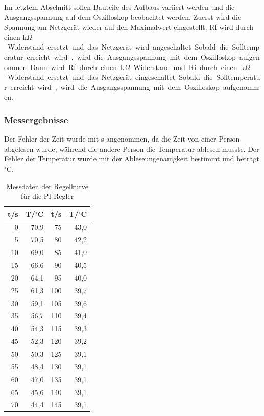 \documentclass[12pt,a4paper]{article}
\begin{document}
Im letztem Abschnitt sollen Bauteile des Aufbaus variiert werden und die Ausgangsspannung auf dem Oszilloskop beobachtet werden. Zuerst wird die Spannung am Netzgerät wieder auf den Maximalwert eingestellt. Rf wird durch einen \unit[470]{k$\Omega$} Widerstand ersetzt und das Netzgerät wird angeschaltet. Sobald die Solltemperatur erreicht wird, wird die Ausgangsspannung mit dem Oszilloskop aufgenommen. Dann wird Rf durch einen \unit[470]{k$\Omega$} Widerstand und Ri durch einen \unit[10]{k$\Omega$} Widerstand ersetzt und das Netzgerät eingeschaltet. Sobald die Solltemperatur erreicht wird, wird die Ausgangsspannung mit dem Oszilloskop aufgenommen.

\subsubsection*{Messergebnisse}

Der Fehler der Zeit wurde mit \unit[0,5]{s} angenommen, da die Zeit von einer Person abgelesen wurde, während die andere Person die Temperatur ablesen musste. Der Fehler der Temperatur wurde mit der Ableseungenauigkeit bestimmt und beträgt \unit[0,1]{$^{\circ}$C}.

\begin{table}[H]
\centering
\begin{tabular}{||r|r||r|r||}

t/s & T/$^\circ$C & t/s & T/$^\circ$C \\ \hline
0 & 70,9 & 75 & 43,0 \\ 
5 & 70,5 & 80 & 42,2 \\ 
10 & 69,0 & 85 & 41,0 \\ 
15 & 66,6 & 90 & 40,5 \\ 
20 & 64,1 & 95 & 40,0 \\ 
25 & 61,3 & 100 & 39,7 \\ 
30 & 59,1 & 105 & 39,6 \\ 
35 & 56,7 & 110 & 39,4 \\ 
40 & 54,3 & 115 & 39,3 \\ 
45 & 52,3 & 120 & 39,2 \\ 
50 & 50,3 & 125 & 39,1 \\ 
55 & 48,4 & 130 & 39,1 \\ 
60 & 47,0 & 135 & 39,1 \\ 
65 & 45,6 & 140 & 39,1 \\ 
70 & 44,4 & 145 & 39,1 \\ 
\end{tabular}
\caption{Messdaten der Regelkurve für die PI-Regler}
\label{tab:3_4}
\end{table}
\end{document}
